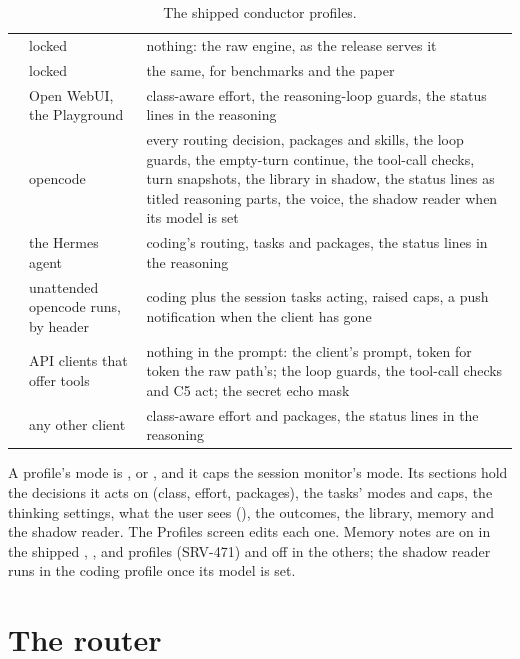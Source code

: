 \begin{table}[htbp]
\centering\small
\caption{The shipped conductor profiles.}\label{tab:profiles}
\begin{tabularx}{\linewidth}{@{}L{.13\linewidth}L{.24\linewidth}Y@{}}
\toprule
{} &  &  \\
\midrule
{} & locked & nothing: the raw engine, as the release serves it \\
 & locked & the same, for benchmarks and the paper \\
 & Open WebUI, the Playground & class-aware effort, the reasoning-loop guards, the status lines in the reasoning \\
 & opencode & every routing decision, packages and skills, the loop guards, the empty-turn continue, the tool-call checks, turn snapshots, the library in shadow, the status lines as titled reasoning parts, the voice, the shadow reader when its model is set \\
 & the Hermes agent & coding's routing, tasks and packages, the status lines in the reasoning \\
 & unattended opencode runs, by header & coding plus the session tasks acting, raised caps, a push notification when the client has gone \\
 & API clients that offer tools & nothing in the prompt: the client's prompt, token for token the raw path's; the loop guards, the tool-call checks and C5 act; the secret echo mask \\
 & any other client & class-aware effort and packages, the status lines in the reasoning \\
\bottomrule
\end{tabularx}
\end{table}

A profile's mode is ,  or , and it caps the session monitor's mode. Its sections hold the decisions it acts on (class, effort, packages), the tasks' modes and caps, the thinking settings, what the user sees (), the outcomes, the library, memory and the shadow reader. The Profiles screen edits each one. Memory notes are on in the shipped , ,  and  profiles (SRV-471) and off in the others; the shadow reader runs in the coding profile once its model is set.

\section{The router}\label{sec:router}

